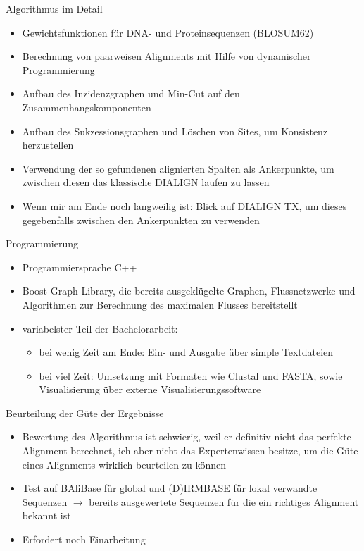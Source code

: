 \documentclass[wide,xcolor={x11names},hyperref={colorlinks=false},pantone312]{beamer}
\begin{document}
\begin{frame}[t]{Algorithmus im Detail}
	\begin{itemize}
		\item Gewichtsfunktionen für DNA- und Proteinsequenzen (BLOSUM62)
		\item Berechnung von paarweisen Alignments mit Hilfe von dynamischer Programmierung
		\item Aufbau des Inzidenzgraphen und Min-Cut auf den Zusammenhangskomponenten
		\item Aufbau des Sukzessionsgraphen und Löschen von Sites, um Konsistenz herzustellen
		\item Verwendung der so gefundenen alignierten Spalten als Ankerpunkte, um zwischen diesen das klassische DIALIGN laufen zu lassen
		\item Wenn mir am Ende noch langweilig ist: Blick auf DIALIGN TX, um dieses gegebenfalls zwischen den Ankerpunkten zu verwenden
	\end{itemize}
\end{frame}

\begin{frame}[t]{Programmierung}
	\begin{itemize}
		\item Programmiersprache C++
		\item Boost Graph Library, die bereits ausgeklügelte Graphen, Flussnetzwerke und Algorithmen zur Berechnung des maximalen Flusses bereitstellt
		\item variabelster Teil der Bachelorarbeit:
		\begin{itemize}
			\item bei wenig Zeit am Ende: Ein- und Ausgabe über simple Textdateien
			\item bei viel Zeit: Umsetzung mit Formaten wie Clustal und FASTA, sowie Visualisierung über externe Visualisierungssoftware
		\end{itemize}
	\end{itemize}
\end{frame}

\begin{frame}[t]{Beurteilung der Güte der Ergebnisse}
	\begin{itemize}
		\item Bewertung des Algorithmus ist schwierig, weil er definitiv nicht das perfekte Alignment berechnet, ich aber nicht das Expertenwissen besitze, um die Güte eines Alignments wirklich beurteilen zu können
		\item Test auf BAliBase für global und (D)IRMBASE für lokal verwandte Sequenzen $\rightarrow$ bereits ausgewertete Sequenzen für die ein richtiges Alignment bekannt ist
		\item Erfordert noch Einarbeitung
	\end{itemize}
\end{frame}
\end{document}
